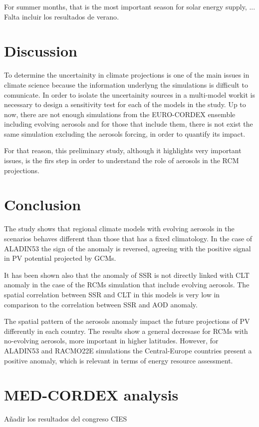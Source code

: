 For summer months, that is the most important season for solar energy supply, ... {\color{red} Falta incluir los resultados de verano}. %

\section{Discussion}

To determine the uncertainity in climate projections is one of the main issues in climate science because the information underlyng the simulations is difficult to comunicate. In order to isolate the uncertainity sources in a multi-model workit is necessary to design a sensitivity test for each of the models in the study. Up to now, there are not enough simulations from the EURO-CORDEX ensemble including evolving aerosols and for those that include them, there is not exist the same simulation excluding the aerosols forcing, in order to quantify its impact.

For that reason, this preliminary study, although it highlights very important issues, is the firs step in order to understand the role of aerosols in the RCM projections.

\section{Conclusion}

The study shows that regional climate models with evolving aerosols in the scenarios behaves different than those that has a fixed climatology. In the case of ALADIN53 the sign of the anomaly is reversed, agreeing with the positive signal in PV potential projected by GCMs.

It has been shown also that the anomaly of SSR is not directly linked with CLT anomaly in the case of the RCMs simulation that include evolving aerosols. The spatial correlation between SSR and CLT in this models is very low in comparison to the correlation between SSR and AOD anomaly.

The spatial pattern of the aerosols anomaly impact the future projections of PV differently in each country. The results show a general decresase for RCMs with no-evolving aerosols, more important in higher latitudes. However, for ALADIN53 and RACMO22E simulations the Central-Europe countries present a positive anomaly, which is relevant in terms of energy resource assessment.

\appendix

\section{MED-CORDEX analysis}

{\color{red}Añadir los resultados del congreso CIES}

% 